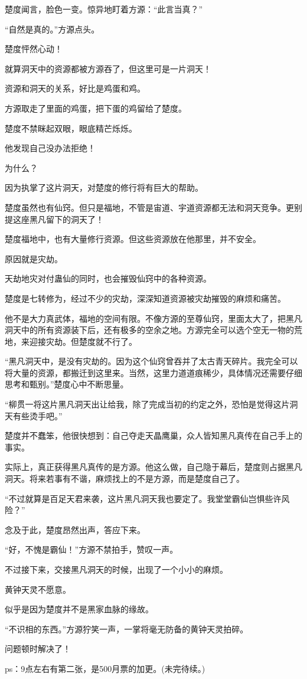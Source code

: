 \begin{this_body}
楚度闻言，脸色一变。惊异地盯着方源：“此言当真？”

“自然是真的。”方源点头。

楚度怦然心动！

就算洞天中的资源都被方源吞了，但这里可是一片洞天！

资源和洞天的关系，好比是鸡蛋和鸡。

方源取走了里面的鸡蛋，把下蛋的鸡留给了楚度。

楚度不禁眯起双眼，眼底精芒烁烁。

他发现自己没办法拒绝！

为什么？

因为执掌了这片洞天，对楚度的修行将有巨大的帮助。

楚度虽然也有仙窍。但只是福地，不管是宙道、宇道资源都无法和洞天竞争。更别提这座黑凡留下的洞天了！

楚度福地中，也有大量修行资源。但这些资源放在他那里，并不安全。

原因就是灾劫。

天劫地灾对付蛊仙的同时，也会摧毁仙窍中的各种资源。

楚度是七转修为，经过不少的灾劫，深深知道资源被灾劫摧毁的麻烦和痛苦。

他不是大力真武体，福地的空间有限。不像方源的至尊仙窍，里面太大了，把黑凡洞天中的所有资源装下后，还有极多的空余之地。方源完全可以选个空无一物的荒地，来迎接灾劫。但楚度就不行了。

“黑凡洞天中，是没有灾劫的。因为这个仙窍曾吞并了太古青天碎片。我完全可以将大量的资源，都搬迁到这里来。当然，这里力道道痕稀少，具体情况还需要仔细思考和甄别。”楚度心中不断思量。

“柳贯一将这片黑凡洞天出让给我，除了完成当初的约定之外，恐怕是觉得这片洞天有些烫手吧。”

楚度并不蠢笨，他很快想到：自己夺走天晶鹰巢，众人皆知黑凡真传在自己手上的事实。

实际上，真正获得黑凡真传的是方源。他这么做，自己隐于幕后，楚度则占据黑凡洞天。将来若事有不谐，麻烦找上的不是方源，而是楚度自己了。

“不过就算是百足天君来袭，这片黑凡洞天我也要定了。我堂堂霸仙岂惧些许风险？”

念及于此，楚度昂然出声，答应下来。

“好，不愧是霸仙！”方源不禁拍手，赞叹一声。

不过接下来，交接黑凡洞天的时候，出现了一个小小的麻烦。

黄钟天灵不愿意。

似乎是因为楚度并不是黑家血脉的缘故。

“不识相的东西。”方源狞笑一声，一掌将毫无防备的黄钟天灵拍碎。

问题顿时解决了！

ps：9点左右有第二张，是500月票的加更。(未完待续。)

\end{this_body}

